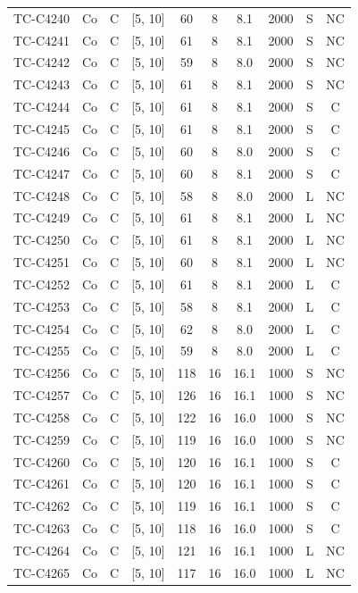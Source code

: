 \begin{longtable}{lccccccccc}
TC-C4240 & Co & C & [5, 10] & 60 & 8 & 8.1 & 2000 & S & NC \\
TC-C4241 & Co & C & [5, 10] & 61 & 8 & 8.1 & 2000 & S & NC \\
TC-C4242 & Co & C & [5, 10] & 59 & 8 & 8.0 & 2000 & S & NC \\
TC-C4243 & Co & C & [5, 10] & 61 & 8 & 8.1 & 2000 & S & NC \\
TC-C4244 & Co & C & [5, 10] & 61 & 8 & 8.1 & 2000 & S & C \\
TC-C4245 & Co & C & [5, 10] & 61 & 8 & 8.1 & 2000 & S & C \\
TC-C4246 & Co & C & [5, 10] & 60 & 8 & 8.0 & 2000 & S & C \\
TC-C4247 & Co & C & [5, 10] & 60 & 8 & 8.1 & 2000 & S & C \\
TC-C4248 & Co & C & [5, 10] & 58 & 8 & 8.0 & 2000 & L & NC \\
TC-C4249 & Co & C & [5, 10] & 61 & 8 & 8.1 & 2000 & L & NC \\
TC-C4250 & Co & C & [5, 10] & 61 & 8 & 8.1 & 2000 & L & NC \\
TC-C4251 & Co & C & [5, 10] & 60 & 8 & 8.1 & 2000 & L & NC \\
TC-C4252 & Co & C & [5, 10] & 61 & 8 & 8.1 & 2000 & L & C \\
TC-C4253 & Co & C & [5, 10] & 58 & 8 & 8.1 & 2000 & L & C \\
TC-C4254 & Co & C & [5, 10] & 62 & 8 & 8.0 & 2000 & L & C \\
TC-C4255 & Co & C & [5, 10] & 59 & 8 & 8.0 & 2000 & L & C \\
TC-C4256 & Co & C & [5, 10] & 118 & 16 & 16.1 & 1000 & S & NC \\
TC-C4257 & Co & C & [5, 10] & 126 & 16 & 16.1 & 1000 & S & NC \\
TC-C4258 & Co & C & [5, 10] & 122 & 16 & 16.0 & 1000 & S & NC \\
TC-C4259 & Co & C & [5, 10] & 119 & 16 & 16.0 & 1000 & S & NC \\
TC-C4260 & Co & C & [5, 10] & 120 & 16 & 16.1 & 1000 & S & C \\
TC-C4261 & Co & C & [5, 10] & 120 & 16 & 16.1 & 1000 & S & C \\
TC-C4262 & Co & C & [5, 10] & 119 & 16 & 16.1 & 1000 & S & C \\
TC-C4263 & Co & C & [5, 10] & 118 & 16 & 16.0 & 1000 & S & C \\
TC-C4264 & Co & C & [5, 10] & 121 & 16 & 16.1 & 1000 & L & NC \\
TC-C4265 & Co & C & [5, 10] & 117 & 16 & 16.0 & 1000 & L & NC \\

\end{longtable}

